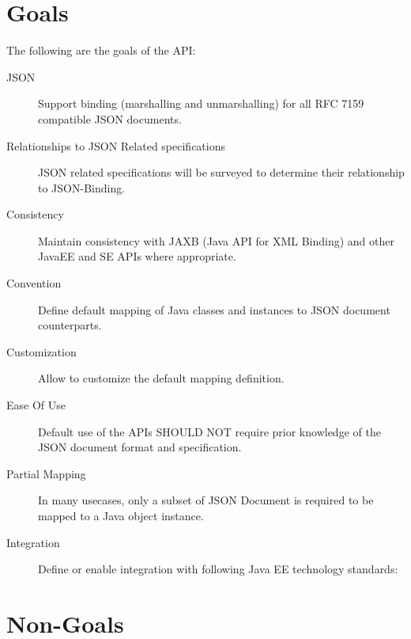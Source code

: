 \section{Goals}

The following are the goals of the API:

\begin{description}

\item[JSON] 
Support binding (marshalling and unmarshalling) for all RFC 7159 compatible JSON documents.

\item [Relationships to JSON Related specifications]
JSON related specifications will be surveyed to determine their relationship to JSON-Binding.

\item[Consistency] 
Maintain consistency with JAXB (Java API for XML Binding) and other JavaEE and SE APIs where appropriate.

\item[Convention] 
Define default mapping of Java classes and instances to JSON document counterparts.

\item[Customization] 
Allow to customize the default mapping definition.

\item[Ease Of Use] 
Default use of the APIs SHOULD NOT require prior knowledge of the JSON document format and specification.

\item[Partial Mapping] 
In many usecases, only a subset of JSON Document is required to be mapped to a Java object  instance.

\item[Integration]
Define or enable integration with following Java EE technology standards:
  
\end{description}

\section{Non-Goals}
\label{non_goals}

